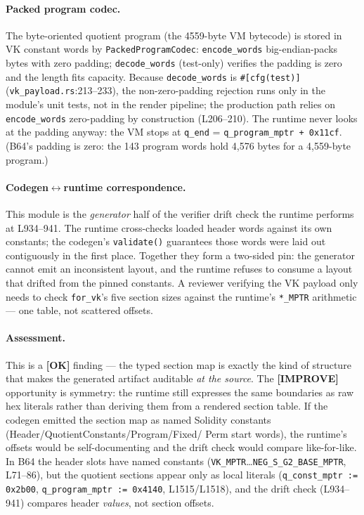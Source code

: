 \paragraph{Packed program codec.}
The byte-oriented quotient program (the 4559-byte VM bytecode) is
stored in VK constant words by \texttt{PackedProgramCodec}:
\texttt{encode\_words} big-endian-packs bytes with zero padding;
\texttt{decode\_words} (test-only) verifies the padding is zero
and the length fits capacity.  Because
\texttt{decode\_words} is \texttt{\#[cfg(test)]}
(\texttt{vk\_payload.rs}:213--233), the non-zero-padding rejection
runs only in the module's unit tests, not in the render pipeline;
the production path relies on \texttt{encode\_words} zero-padding
by construction (L206--210). The runtime never looks at the
padding anyway: the VM stops at \texttt{q\_end} =
\texttt{q\_\allowbreak{}program\_\allowbreak{}mptr + 0x11cf}. (B64's padding is zero: the
143 program words hold 4,576 bytes for a 4,559-byte program.)

\paragraph{Codegen$\leftrightarrow$runtime correspondence.}
This module is the \emph{generator} half of the verifier drift
check the runtime performs at L934--941. The runtime cross-checks
loaded header words against its own constants; the codegen's
\texttt{validate()} guarantees those words were laid out
contiguously in the first place. Together they form a
two-sided pin: the generator cannot emit an inconsistent layout,
and the runtime refuses to consume a layout that drifted from the
pinned constants. A reviewer verifying the VK payload only needs
to check \texttt{for\_vk}'s five section sizes against the
runtime's \texttt{*\_MPTR} arithmetic --- one table, not
scattered offsets.

\paragraph{Assessment.} This is a
\textcolor{tracegreen}{\textbf{[OK]}} finding --- the typed
section map is exactly the kind of structure that makes the
generated artifact auditable \emph{at the source}. The
\textcolor{codegenblue}{\textbf{[IMPROVE]}} opportunity is
symmetry: the runtime still expresses the same boundaries as raw
hex literals rather than deriving them from a rendered section
table. If the codegen emitted the section map as
named Solidity constants (Header/QuotientConstants/Program/Fixed/
Perm start words), the runtime's offsets would be
self-documenting and the drift check would compare like-for-like.
 In B64 the header slots have named constants
(\texttt{VK\_MPTR}\ldots\texttt{NEG\_\allowbreak{}S\_\allowbreak{}G2\_\allowbreak{}BASE\_\allowbreak{}MPTR},
L71--86), but the quotient sections appear only as local literals
(\texttt{q\_\allowbreak{}const\_\allowbreak{}mptr := 0x2b00}, \texttt{q\_\allowbreak{}program\_\allowbreak{}mptr :=
0x4140}, L1515/L1518), and the drift check (L934--941) compares
header \emph{values}, not section offsets.


